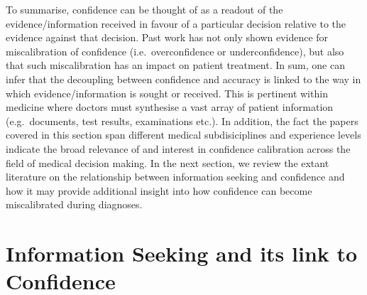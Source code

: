\documentclass[a4paper, nobind]{templates/ociamthesis}
\begin{document}
\hfill\break
To summarise, confidence can be thought of as a readout of the evidence/information received in favour of a particular decision relative to the evidence against that decision. Past work has not only shown evidence for miscalibration of confidence (i.e.~overconfidence or underconfidence), but also that such miscalibration has an impact on patient treatment. In sum, one can infer that the decoupling between confidence and accuracy is linked to the way in which evidence/information is sought or received. This is pertinent within medicine where doctors must synthesise a vast array of patient information (e.g.~documents, test results, examinations etc.). In addition, the fact the papers covered in this section span different medical subdisiciplines and experience levels indicate the broad relevance of and interest in confidence calibration across the field of medical decision making. In the next section, we review the extant literature on the relationship between information seeking and confidence and how it may provide additional insight into how confidence can become miscalibrated during diagnoses.

\section{Information Seeking and its link to Confidence}\label{information-seeking-and-its-link-to-confidence}
\end{document}
